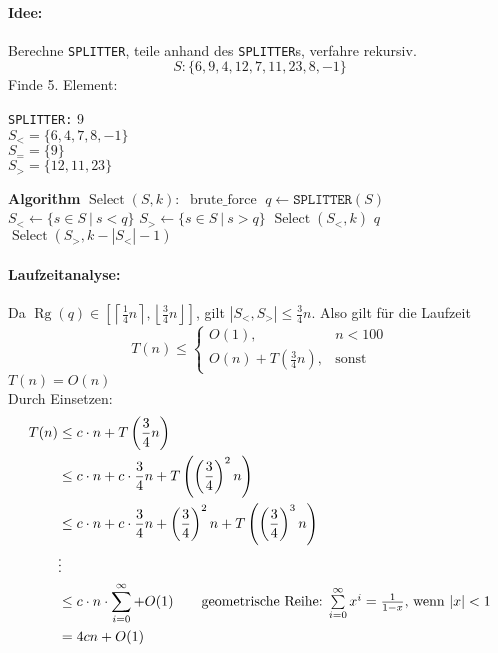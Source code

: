 \paragraph*{Idee:} Berechne \texttt{SPLITTER}, teile anhand des \texttt{SPLITTER}s, verfahre rekursiv.
\Bsp \[S: \{6, 9, 4, 12, 7, 11, 23, 8, -1\}\]
Finde 5. Element:
\begin{minipage}[t]{\linewidth}
\texttt{SPLITTER:} 9 \\
$S_< = \{6, 4, 7, 8, -1\}$\\
$S_= = \{9\}$\\
$S_> = \{12, 11, 23\}$
\end{minipage}
\begin{algorithmic}
\STATE \textbf{Algorithm} $\operatorname{Select}(S, k):$
        \STATE $\operatorname{brute\_force}$\hspace{2cm}
    \ENDIF
    \STATE $q \gets \texttt{SPLITTER}\left(S\right)$
    \STATE $S_< \gets \{s \in S\ |\ s < q\}$
    \STATE $S_> \gets \{s \in S\ |\ s > q\}$
        \RETURN $\operatorname{Select}(S_<,k)$
        \RETURN $q$
    \ELSE %
        \RETURN $\operatorname{Select}(S_>,k - \left|S_<\right| - 1)$
    \ENDIF
\end{algorithmic}
\paragraph*{Laufzeitanalyse:}
Da $\operatorname{Rg}(q) \in \left[\left\lceil\frac{1}{4}n\right\rceil, \left\lfloor\frac{3}{4}n\right\rfloor\right]$, gilt $|S_<, S_>| \leq \frac{3}{4} n$. Also gilt für die Laufzeit
\[
T(n) \leq \begin{cases}
    O(1), & n < 100 \\
    O(n) + T\left(\frac{3}{4} n\right), & \text{sonst}
\end{cases}\]
\Beh $T(n) = O(n)$\\
Durch Einsetzen:
\begin{align*}
 T(n)   &\leq c \cdot n + T\left(\frac{3}{4} n\right) \\
        &\leq c \cdot n + c \cdot \frac{3}{4} n + T\left(\left(\frac{3}{4}\right)^2 n\right) \\
        &\leq c \cdot n + c \cdot \frac{3}{4} n + \left(\frac{3}{4}\right)^2 n + T\left(\left(\frac{3}{4}\right)^3 n\right) \\
        & \vdots\\
        &\leq c \cdot n \cdot \sum\limits_{i=0}^\infty + O(1) \tag*{geometrische Reihe: 
                $\sum\limits_{i = 0}^{\infty} x^i = \frac{1}{1-x}$, wenn $|x| < 1$}\\
        &= 4cn + O(1)
\end{align*}
